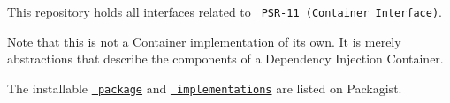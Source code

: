 This repository holds all interfaces related to \href{https://www.php-fig.org/psr/psr-11/}{\texttt{ PSR-\/11 (Container Interface)}}.

Note that this is not a Container implementation of its own. It is merely abstractions that describe the components of a Dependency Injection Container.

The installable \href{https://packagist.org/packages/psr/container}{\texttt{ package}} and \href{https://packagist.org/providers/psr/container-implementation}{\texttt{ implementations}} are listed on Packagist. 